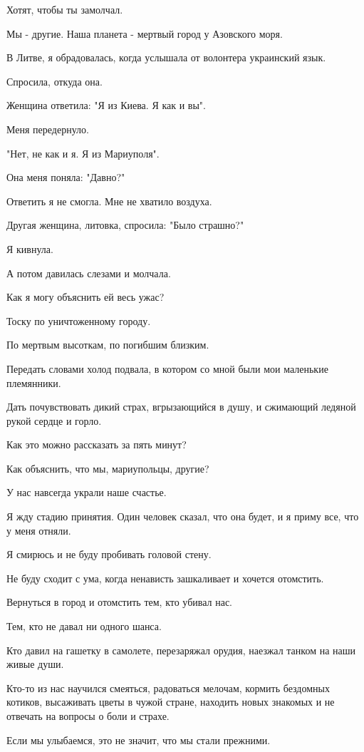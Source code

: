 Хотят, чтобы ты замолчал. 

Мы -  другие. Наша планета - мертвый город у Азовского моря.

В Литве, я  обрадовалась, когда услышала  от волонтера украинский язык.

Спросила, откуда она.

Женщина  ответила: "Я из Киева. Я как и вы". 

Меня передернуло. 

"Нет, не как и я. Я из Мариуполя". 

Она меня поняла: "Давно?"

Ответить я не смогла. Мне не хватило воздуха. 

Другая женщина, литовка, спросила: "Было страшно?"

Я  кивнула.

А потом давилась слезами и молчала. 

Как я могу объяснить   ей весь ужас? 

Тоску по уничтоженному городу.

По  мертвым высоткам, по погибшим  близким. 

Передать словами холод подвала, в котором со мной были мои маленькие
племянники. 

Дать почувствовать дикий страх, вгрызающийся в душу,  и сжимающий ледяной рукой
сердце и горло. 

Как это можно рассказать за  пять минут? 

Как объяснить, что мы, мариупольцы, другие?

У нас  навсегда  украли наше   счастье.

Я жду стадию принятия. Один человек сказал, что она  будет, и я приму все, что
у меня отняли.

Я смирюсь и не буду пробивать головой стену. 

Не буду сходит с ума,  когда ненависть зашкаливает и хочется отомстить. 

Вернуться в город и отомстить тем, кто убивал нас. 

Тем, кто не давал ни одного шанса. 

Кто давил на гашетку в самолете, перезаряжал орудия,  наезжал танком на наши
живые души.

Кто-то из нас научился смеяться, радоваться мелочам, кормить бездомных котиков,
высаживать цветы в чужой стране, находить новых знакомых и не отвечать на
вопросы о боли и страхе. 

Если мы улыбаемся, это не значит, что мы стали прежними. 

